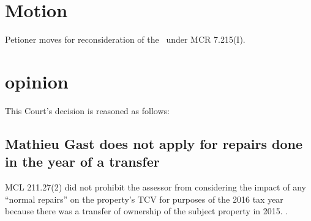 \documentclass[12pt,\documentclassflag]{michiganCourtOfAppealsBrief}
\begin{document}
\section{Motion}






Petioner moves for reconsideration of the \cite{FOJ}\ under MCR 7.215(I).


\section{opinion}
This Court's decision is reasoned as follows:

\subsection{Mathieu Gast does not apply for repairs done in the year of a transfer}

MCL 211.27(2) did not prohibit the assessor from considering the impact
of any ``normal repairs'' on the property's TCV for purposes of the 2016 tax year because there was a transfer of ownership of the
subject property in 2015. .
\end{document}
